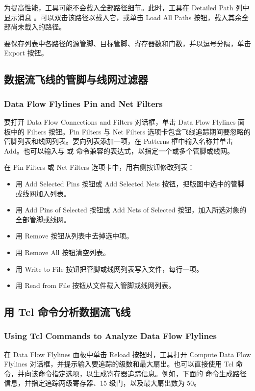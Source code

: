 为提高性能，工具可能不会载入全部路径细节。此时，工具在 Detailed Path 列中显示消息 。可以双击该路径以载入它，或单击 Load All Paths 按钮，载入其余全部尚未载入的路径。

要保存列表中各路径的源管脚、目标管脚、寄存器数和门数，并以逗号分隔，单击 Export 按钮。

\subsection{数据流飞线的管脚与线网过滤器}
\label{sec:gui-fly-pinnet}
\subsubsection*{Data Flow Flylines Pin and Net Filters}

要打开 Data Flow Connections and Filters 对话框，单击 Data Flow Flylines 面板中的 Filters 按钮。Pin Filters 与 Net Filters 选项卡包含飞线追踪期间要忽略的管脚列表和线网列表。要向列表添加一项，在 Patterns 框中输入名称并单击 Add。也可以输入与  或  命令兼容的表达式，以指定一个或多个管脚或线网。

在 Pin Filters 或 Net Filters 选项卡中，用右侧按钮修改列表：
\begin{itemize}
  \item 用 Add Selected Pins 按钮或 Add Selected Nets 按钮，把版图中选中的管脚或线网加入列表。
  \item 用 Add Pins of Selected 按钮或 Add Nets of Selected 按钮，加入所选对象的全部管脚或线网。
  \item 用 Remove 按钮从列表中去掉选中项。
  \item 用 Remove All 按钮清空列表。
  \item 用 Write to File 按钮把管脚或线网列表写入文件，每行一项。
  \item 用 Read from File 按钮从文件载入管脚或线网列表。
\end{itemize}

\subsection{用 Tcl 命令分析数据流飞线}
\subsubsection*{Using Tcl Commands to Analyze Data Flow Flylines}

在 Data Flow Flylines 面板中单击 Reload 按钮时，工具打开 Compute Data Flow Flylines 对话框，并提示输入要追踪的级数和最大扇出。也可以直接使用  Tcl 命令，并向该命令指定选项，以生成寄存器追踪信息。例如，下面的  命令生成路径信息，并指定追踪两级寄存器、15 级门，以及最大扇出数为 50。

